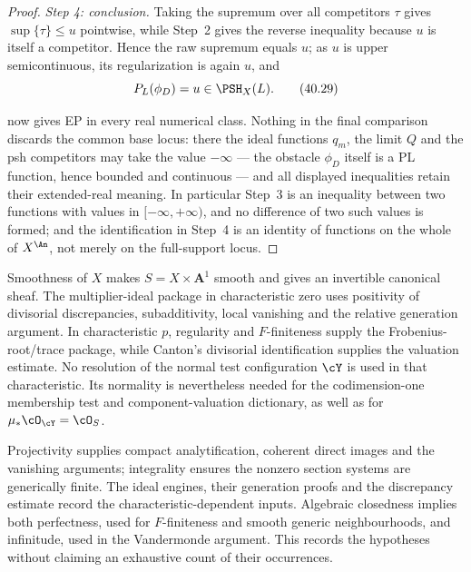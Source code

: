 \begin{proof}
\emph{Step 4: conclusion.}  Taking the supremum over all competitors
$\tau$ gives $\sup\{\tau\}\le u$ pointwise, while Step~2 gives the
reverse inequality because $u$ is itself a competitor.  Hence the raw
supremum equals $u$; as $u$ is upper semicontinuous, its regularization is
again $u$, and
\[
                         P_L(\phi_D)=u\in\PSH_X(L).
\tag{40.29}\label{eq:bj-smooth-obstacle-envelope}
\]

 now gives EP in every real
numerical class.  Nothing in the final comparison discards the common base
locus: there the ideal functions $q_m$, the limit $Q$ and the psh
competitors may take the value $-\infty$ --- the obstacle $\phi_D$ itself
is a PL function, hence bounded and continuous --- and all displayed
inequalities retain their extended-real meaning.  In particular Step~3 is an inequality between two
functions with values in $[-\infty,+\infty)$, and no difference of two
such values is formed; and the identification in Step~4 is an identity of
functions on the whole of $X^{\An}$, not merely on the full-support locus.
\end{proof}

\begin{remark}
\label{rem:ch40-hypothesis-map}
Smoothness of $X$ makes $S=X\times\mathbf A^1$ smooth and gives
an invertible canonical sheaf.  The multiplier-ideal package in
characteristic zero uses positivity of divisorial discrepancies,
subadditivity, local vanishing and the relative generation argument.
In characteristic $p$, regularity and $F$-finiteness supply the
Frobenius-root/trace package, while Canton's divisorial identification
supplies the valuation estimate.  No resolution of the normal test
configuration $\cY$ is used in that characteristic.  Its normality is
nevertheless needed for the codimension-one membership test and
component-valuation dictionary, as well as for
$\mu_*\cO_{\cY}=\cO_S$.

Projectivity supplies compact analytification, coherent direct images and
the vanishing arguments; integrality ensures the nonzero section systems
are generically finite.  The ideal engines, their generation proofs and
the discrepancy estimate record the characteristic-dependent inputs.
Algebraic closedness implies both perfectness, used for $F$-finiteness
and smooth generic neighbourhoods, and infinitude, used in the
Vandermonde argument.  This records the hypotheses without claiming an
exhaustive count of their occurrences.
\end{remark}

